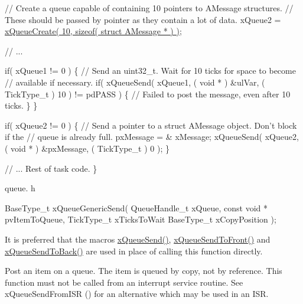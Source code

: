 \begin{DoxyPre}   // Create a queue capable of containing 10 pointers to AMessage structures.
   // These should be passed by pointer as they contain a lot of data.
   xQueue2 = \hyperlink{queue_8h_aeb858b824bd74a934ea7ebb81af2a6bb}{xQueueCreate( 10, sizeof( struct AMessage * ) )};\end{DoxyPre}



\begin{DoxyPre}   // ...\end{DoxyPre}



\begin{DoxyPre}   if( xQueue1 != 0 )
   \{
    // Send an uint32\_t.  Wait for 10 ticks for space to become
    // available if necessary.
    if( xQueueSend( xQueue1, ( void * ) \&ulVar, ( TickType\_t ) 10 ) != pdPASS )
    \{
        // Failed to post the message, even after 10 ticks.
    \}
   \}\end{DoxyPre}



\begin{DoxyPre}   if( xQueue2 != 0 )
   \{
    // Send a pointer to a struct AMessage object.  Don't block if the
    // queue is already full.
    pxMessage = \& xMessage;
    xQueueSend( xQueue2, ( void * ) \&pxMessage, ( TickType\_t ) 0 );
   \}\end{DoxyPre}



\begin{DoxyPre}   // ... Rest of task code.
\}
\end{DoxyPre}


queue. h 
\begin{DoxyPre}
BaseType\_t xQueueGenericSend(
                                QueueHandle\_t xQueue,
                                const void * pvItemToQueue,
                                TickType\_t xTicksToWait
                                BaseType\_t xCopyPosition
                            );
  \end{DoxyPre}


It is preferred that the macros \hyperlink{queue_8h_af7eb49d3249351176992950d9185abe9}{x\+Queue\+Send()}, \hyperlink{queue_8h_aa612fcc2b1ceee0200f34b942e300b41}{x\+Queue\+Send\+To\+Front()} and \hyperlink{queue_8h_a81d24a2c1199d58efb76fbee15853112}{x\+Queue\+Send\+To\+Back()} are used in place of calling this function directly.

Post an item on a queue. The item is queued by copy, not by reference. This function must not be called from an interrupt service routine. See x\+Queue\+Send\+From\+I\+SR () for an alternative which may be used in an I\+SR.


